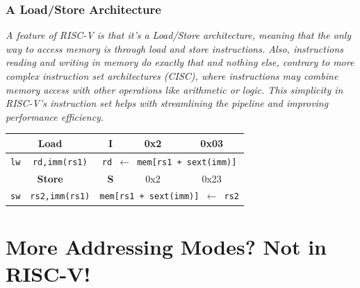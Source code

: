 \subsubsection{A Load/Store Architecture}
\textit{A feature of RISC-V is that it's a Load/Store architecture, meaning that the only way to access memory is through load and store instructions. Also, instructions reading and writing in memory do exactly that and nothing else, contrary to more complex instruction set architectures (CISC), where instructions may combine memory access with other operations like arithmetic or logic. This simplicity in RISC-V's instruction set helps with streamlining the pipeline and improving performance efficiency.} \\ \vspace*{5px}

\begin{center}
    \begin{tabular}{|c|c|c|c|c|}
        \hline
        \multicolumn{2}{|c|}{\textbf{Load}} & \textbf{I} & 0x2 & 0x03 \\ 
        \hline
        \texttt{lw} & \texttt{rd,imm(rs1)} & \multicolumn{3}{c|}{\texttt{rd $\leftarrow$ mem[rs1 + sext(imm)]}} \\ 
        \hline
        \multicolumn{2}{|c|}{\textbf{Store}} & \textbf{S} & 0x2 & 0x23 \\ 
        \hline
        \texttt{sw} & \texttt{rs2,imm(rs1)} & \multicolumn{3}{c|}{\texttt{mem[rs1 + sext(imm)] $\leftarrow$ rs2}} \\ 
        \hline
    \end{tabular}
\end{center}

\section{More Addressing Modes? Not in RISC-V!}


